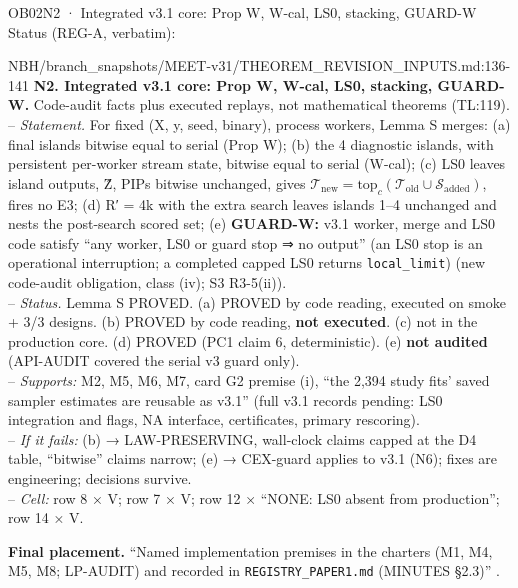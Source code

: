 \begin{card}{OB02}{N2 · Integrated v3.1 core: Prop W, W-cal, LS0, stacking, GUARD-W}
Status (REG-A, verbatim):  
\begin{stmt}{NBH/branch_snapshots/MEET-v31/THEOREM_REVISION_INPUTS.md:136-141}
\textbf{N2. Integrated v3.1 core: Prop W, W-cal, LS0, stacking, GUARD-W.} Code-audit facts plus executed replays, not mathematical theorems (TL:119).\\
– \emph{Statement.} For fixed (X, y, seed, binary), process workers, Lemma S merges: (a) final islands bitwise equal to serial (Prop W); (b) the 4 diagnostic islands, with persistent per-worker stream state, bitwise equal to serial (W-cal); (c) LS0 leaves island outputs, Ẑ, PIPs bitwise unchanged, gives $𝒯_{\mathrm{new}} = \mathrm{top}_c(𝒯_{\mathrm{old}} ∪ 𝒮_{\mathrm{added}})$, fires no E3; (d) R′ = 4k with the extra search leaves islands 1–4 unchanged and nests the post-search scored set; (e) \textbf{GUARD-W:} v3.1 worker, merge and LS0 code satisfy ``any worker, LS0 or guard stop ⇒ no output'' (an LS0 stop is an operational interruption; a completed capped LS0 returns \texttt{local\_limit}) (new code-audit obligation, class (iv); S3 R3-5(ii)).\\
– \emph{Status.} Lemma S PROVED. (a) PROVED by code reading, executed on smoke + 3/3 designs. (b) PROVED by code reading, \textbf{not executed}. (c) not in the production core. (d) PROVED (PC1 claim 6, deterministic). (e) \textbf{not audited} (API-AUDIT covered the serial v3 guard only).\\
– \emph{Supports:} M2, M5, M6, M7, card G2 premise (i), ``the 2,394 study fits' saved sampler estimates are reusable as v3.1'' (full v3.1 records pending: LS0 integration and flags, NA interface, certificates, primary rescoring).\\
– \emph{If it fails:} (b) → LAW-PRESERVING, wall-clock claims capped at the D4 table, ``bitwise'' claims narrow; (e) → CEX-guard applies to v3.1 (N6); fixes are engineering; decisions survive.\\
– \emph{Cell:} row 8 × V; row 7 × V; row 12 × ``NONE: LS0 absent from production''; row 14 × V.
\end{stmt}
\textbf{Final placement.} ``Named implementation premises in the charters (M1, M4, M5, M8; LP-AUDIT) and recorded in \texttt{REGISTRY\_PAPER1.md} (MINUTES §2.3)'' .


\end{card}
